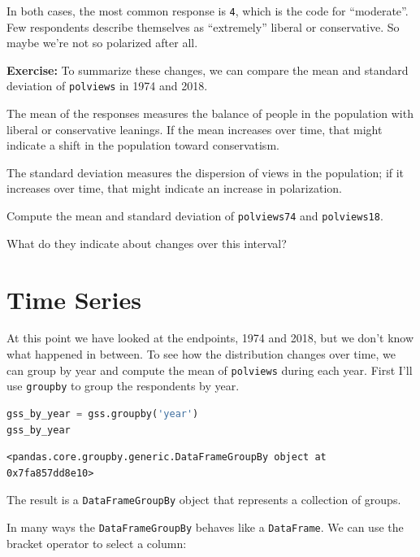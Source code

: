In both cases, the most common response is \passthrough{\lstinline!4!},
which is the code for ``moderate''. Few respondents describe themselves
as ``extremely'' liberal or conservative. So maybe we're not so
polarized after all.

\textbf{Exercise:} To summarize these changes, we can compare the mean
and standard deviation of \passthrough{\lstinline!polviews!} in 1974 and
2018.

The mean of the responses measures the balance of people in the
population with liberal or conservative leanings. If the mean increases
over time, that might indicate a shift in the population toward
conservatism.

The standard deviation measures the dispersion of views in the
population; if it increases over time, that might indicate an increase
in polarization.

Compute the mean and standard deviation of
\passthrough{\lstinline!polviews74!} and
\passthrough{\lstinline!polviews18!}.

What do they indicate about changes over this interval?

\hypertarget{time-series}{%
\section{Time Series}\label{time-series}}

At this point we have looked at the endpoints, 1974 and 2018, but we
don't know what happened in between. To see how the distribution changes
over time, we can group by year and compute the mean of
\passthrough{\lstinline!polviews!} during each year. First I'll use
\passthrough{\lstinline!groupby!} to group the respondents by year.

\begin{lstlisting}[language=Python]
gss_by_year = gss.groupby('year')
gss_by_year
\end{lstlisting}

\begin{lstlisting}[]
<pandas.core.groupby.generic.DataFrameGroupBy object at 0x7fa857dd8e10>
\end{lstlisting}

The result is a \passthrough{\lstinline!DataFrameGroupBy!} object that
represents a collection of groups.

In many ways the \passthrough{\lstinline!DataFrameGroupBy!} behaves like
a \passthrough{\lstinline!DataFrame!}. We can use the bracket operator
to select a column:

